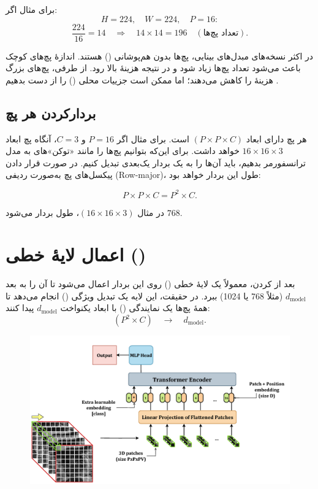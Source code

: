برای مثال اگر:
\[
H = 224, \quad W = 224, \quad P = 16:
\]
\[
\frac{224}{16} = 14 \quad \Rightarrow \quad 14 \times 14 = 196 \quad (\text{تعداد پچ‌ها}).
\]

در اکثر نسخه‌های مبدل‌های بینایی، پچ‌ها بدون هم‌پوشانی () هستند. اندازهٔ پچ‌های کوچک باعث می‌شود تعداد پچ‌ها زیاد شود و در نتیجه هزینهٔ  بالا رود. از طرفی، پچ‌های بزرگ هزینهٔ  را کاهش می‌دهند؛ اما ممکن است جزییات محلی () را از دست بدهیم \cite{dosovitskiy2020image}.

\subsection{بردارکردن هر پچ}
هر پچ دارای ابعاد \((P \times P \times C)\) است. برای مثال اگر \(P=16\) و \(C=3\)، آنگاه پچ ابعاد \(16 \times 16 \times 3\) خواهد داشت.  
برای این‌که بتوانیم پچ‌ها را مانند «توکن»‌های  به مدل ترانسفورمر بدهیم، باید آن‌ها را به یک بردار یک‌بعدی تبدیل کنیم. در صورت قرار دادن پیکسل‌های پچ به‌صورت ردیفی (Row-major)، طول این بردار خواهد بود:

\begin{equation}
	P \times P \times C = P^2 \times C.
	\label{eq:patch_volume}
\end{equation}

در مثال \((16 \times 16 \times 3)\)، طول بردار می‌شود \(768\).


\section{اعمال لایهٔ خطی ()}
بعد از  کردن، معمولاً یک لایهٔ خطی () روی این بردار اعمال می‌شود تا آن را به بعد \(d_{\text{model}}\) (مثلاً 768 یا 1024) ببرد. در حقیقت، این لایه یک تبدیل ویژگی () انجام می‌دهد تا همهٔ پچ‌ها یک نمایندگی () با ابعاد یکنواخت \(d_{\text{model}}\) پیدا کنند:
\[
(P^2 \times C) \quad \rightarrow \quad d_{\text{model}}.
\]

\begin{figure}[h]
	\centering
	\begin{minipage}[b]{0.9\textwidth}
		\centering
		\includegraphics[width=\textwidth]{transformer_images/vision_transformer_embedding.png}
		\caption{}
		\label{fig:Embedding Vision Transformer}
	\end{minipage}
	\hfill
\end{figure}

